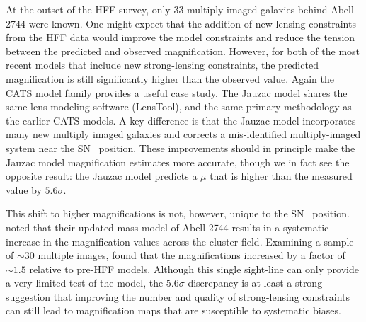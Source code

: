 At the outset of the HFF survey, only 33 multiply-imaged galaxies
behind Abell 2744 were known.  One might expect that the addition of
new lensing constraints from the HFF data would improve the model
constraints and reduce the tension between the predicted and observed
magnification.  However, for both of the most recent
models \citep{Jauzac:2014c,Lam:2014} that include new strong-lensing
constraints, the predicted magnification is still significantly higher
than the observed value.  Again the CATS model family provides a
useful case study.  The Jauzac model shares the same lens modeling
software (LensTool), and the same primary methodology as the earlier
CATS models.  A key difference is that the Jauzac model incorporates
many new multiply imaged galaxies and corrects a mis-identified
multiply-imaged system near the SN \tomas\ position.  These
improvements should in principle make the Jauzac model magnification
estimates more accurate, though we in fact see the opposite result:
the Jauzac model predicts a $\mu$ that is higher than the measured
value by $5.6\sigma$.

This shift to higher magnifications is not, however, unique to the
SN \tomas\ position.  \citet{Jauzac:2014c} noted that their updated
mass model of Abell 2744 results in a systematic increase in the
magnification values across the cluster field. Examining a sample of
$\sim$30 multiple images, \citeauthor{Jauzac:2014c} found that the
magnifications increased by a factor of $\sim1.5$ relative to pre-HFF
models.  Although this single sight-line can only provide a very
limited test of the model, the $5.6\sigma$ discrepancy is at least a
strong suggestion that improving the number and quality of
strong-lensing constraints can still lead to magnification maps that
are susceptible to systematic biases.


